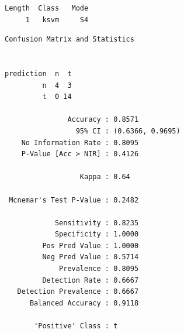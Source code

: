 \documentclass[
]{article}
\newenvironment{Shaded}{\begin{snugshade}}{\end{snugshade}}
\newcommand{\AttributeTok}[1]{\textcolor[rgb]{0.80,0.80,0.80}{#1}}
\newcommand{\CommentTok}[1]{\textcolor[rgb]{0.50,0.62,0.50}{#1}}
\newcommand{\ErrorTok}[1]{\textcolor[rgb]{0.76,0.75,0.62}{#1}}
\newcommand{\FloatTok}[1]{\textcolor[rgb]{0.75,0.75,0.82}{#1}}
\newcommand{\FunctionTok}[1]{\textcolor[rgb]{0.94,0.94,0.56}{#1}}
\newcommand{\NormalTok}[1]{\textcolor[rgb]{0.80,0.80,0.80}{#1}}
\newcommand{\OtherTok}[1]{\textcolor[rgb]{0.94,0.94,0.56}{#1}}
\newcommand{\SpecialCharTok}[1]{\textcolor[rgb]{0.86,0.64,0.64}{#1}}
\newcommand{\StringTok}[1]{\textcolor[rgb]{0.80,0.58,0.58}{#1}}
\begin{document}
\begin{verbatim}
Length  Class   Mode 
     1   ksvm     S4 
\end{verbatim}

\begin{Shaded}
\end{Shaded}

\begin{verbatim}
Confusion Matrix and Statistics

          
prediction  n  t
         n  4  3
         t  0 14
                                          
               Accuracy : 0.8571          
                 95% CI : (0.6366, 0.9695)
    No Information Rate : 0.8095          
    P-Value [Acc > NIR] : 0.4126          
                                          
                  Kappa : 0.64            
                                          
 Mcnemar's Test P-Value : 0.2482          
                                          
            Sensitivity : 0.8235          
            Specificity : 1.0000          
         Pos Pred Value : 1.0000          
         Neg Pred Value : 0.5714          
             Prevalence : 0.8095          
         Detection Rate : 0.6667          
   Detection Prevalence : 0.6667          
      Balanced Accuracy : 0.9118          
                                          
       'Positive' Class : t               
                                          
\end{verbatim}
\end{document}

